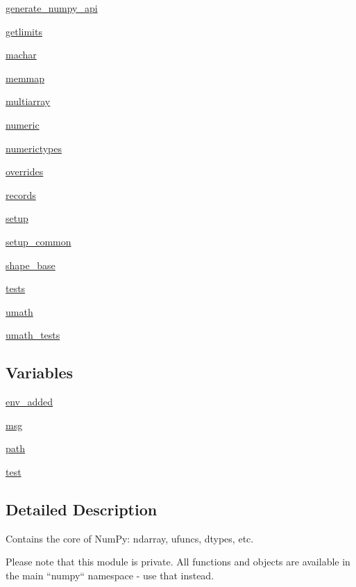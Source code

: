 \begin{DoxyCompactItemize}
 \hyperlink{namespacenumpy_1_1core_1_1generate__numpy__api}{generate\+\_\+numpy\+\_\+api}
\item 
 \hyperlink{namespacenumpy_1_1core_1_1getlimits}{getlimits}
\item 
 \hyperlink{namespacenumpy_1_1core_1_1machar}{machar}
\item 
 \hyperlink{namespacenumpy_1_1core_1_1memmap}{memmap}
\item 
 \hyperlink{namespacenumpy_1_1core_1_1multiarray}{multiarray}
\item 
 \hyperlink{namespacenumpy_1_1core_1_1numeric}{numeric}
\item 
 \hyperlink{namespacenumpy_1_1core_1_1numerictypes}{numerictypes}
\item 
 \hyperlink{namespacenumpy_1_1core_1_1overrides}{overrides}
\item 
 \hyperlink{namespacenumpy_1_1core_1_1records}{records}
\item 
 \hyperlink{namespacenumpy_1_1core_1_1setup}{setup}
\item 
 \hyperlink{namespacenumpy_1_1core_1_1setup__common}{setup\+\_\+common}
\item 
 \hyperlink{namespacenumpy_1_1core_1_1shape__base}{shape\+\_\+base}
\item 
 \hyperlink{namespacenumpy_1_1core_1_1tests}{tests}
\item 
 \hyperlink{namespacenumpy_1_1core_1_1umath}{umath}
\item 
 \hyperlink{namespacenumpy_1_1core_1_1umath__tests}{umath\+\_\+tests}
\end{DoxyCompactItemize}
\subsection*{Variables}
\begin{DoxyCompactItemize}
\item 
\hyperlink{namespacenumpy_1_1core_ade06b973b69ca298b1bdb3dd16b2beea}{env\+\_\+added}
\item 
\hyperlink{namespacenumpy_1_1core_a208ce5185d73e25a6fd61510ccf391b4}{msg}
\item 
\hyperlink{namespacenumpy_1_1core_a0d4a95e20828ea3a0657fc49a1edcb08}{path}
\item 
\hyperlink{namespacenumpy_1_1core_a1d7a801bf76ffacb537556edb42e11a0}{test}
\end{DoxyCompactItemize}


\subsection{Detailed Description}
\begin{DoxyVerb}Contains the core of NumPy: ndarray, ufuncs, dtypes, etc.

Please note that this module is private.  All functions and objects
are available in the main ``numpy`` namespace - use that instead.\end{DoxyVerb}
 

